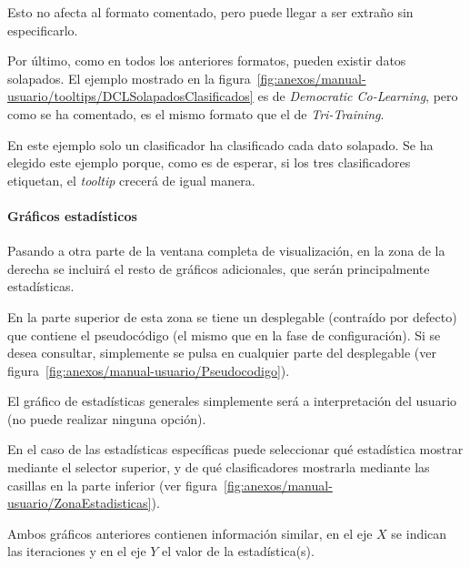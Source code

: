 Esto no afecta al formato comentado, pero puede llegar a ser extraño sin
especificarlo.

Por último, como en todos los anteriores formatos, pueden existir datos
solapados. El ejemplo mostrado en la
figura~\ref{fig:anexos/manual-usuario/tooltips/DCLSolapadosClasificados} es de
\textit{Democratic Co-Learning}, pero como se ha comentado, es el mismo formato
que el de \textit{Tri-Training}.


En este ejemplo solo un clasificador ha clasificado cada dato solapado. Se ha
elegido este ejemplo porque, como es de esperar, si los tres clasificadores
etiquetan, el \textit{tooltip} crecerá de igual manera.

\paragraph{Gráficos estadísticos} Pasando a otra parte de la ventana completa de
visualización, en la zona de la derecha se incluirá el resto de gráficos
adicionales, que serán principalmente estadísticas.


En la parte superior de esta zona se tiene un desplegable (contraído por
defecto) que contiene el pseudocódigo (el mismo que en la fase de
configuración). Si se desea consultar, simplemente se pulsa en cualquier parte
del desplegable (ver figura~\ref{fig:anexos/manual-usuario/Pseudocodigo}).


El gráfico de estadísticas generales simplemente será a interpretación del
usuario (no puede realizar ninguna opción). 

En el caso de las estadísticas específicas puede seleccionar qué estadística
mostrar mediante el selector superior, y de qué clasificadores mostrarla
mediante las casillas en la parte inferior (ver
figura~\ref{fig:anexos/manual-usuario/ZonaEstadisticas}).

Ambos gráficos anteriores contienen información similar, en el eje $X$ se
indican las iteraciones y en el eje $Y$ el valor de la estadística(s).

